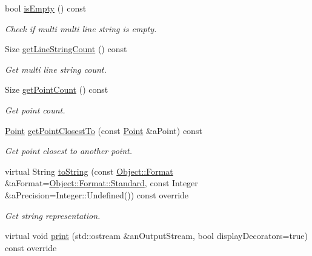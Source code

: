 \begin{DoxyCompactItemize}
bool \hyperlink{classostk_1_1math_1_1geom_1_1d2_1_1objects_1_1_multi_line_string_a5d9130266958b3cddbcfd9ac085074f9}{is\+Empty} () const
\begin{DoxyCompactList}\small\item\em Check if multi multi line string is empty. \end{DoxyCompactList}\item 
Size \hyperlink{classostk_1_1math_1_1geom_1_1d2_1_1objects_1_1_multi_line_string_ad4bf5470a4824babbe4fb314b58537a0}{get\+Line\+String\+Count} () const
\begin{DoxyCompactList}\small\item\em Get multi line string count. \end{DoxyCompactList}\item 
Size \hyperlink{classostk_1_1math_1_1geom_1_1d2_1_1objects_1_1_multi_line_string_a79be04f2c6bddfa1689b6eefba45fc83}{get\+Point\+Count} () const
\begin{DoxyCompactList}\small\item\em Get point count. \end{DoxyCompactList}\item 
\hyperlink{classostk_1_1math_1_1geom_1_1d2_1_1objects_1_1_point}{Point} \hyperlink{classostk_1_1math_1_1geom_1_1d2_1_1objects_1_1_multi_line_string_ad8b2805d38191a13711bd7255ea48e9f}{get\+Point\+Closest\+To} (const \hyperlink{classostk_1_1math_1_1geom_1_1d2_1_1objects_1_1_point}{Point} \&a\+Point) const
\begin{DoxyCompactList}\small\item\em Get point closest to another point. \end{DoxyCompactList}\item 
virtual String \hyperlink{classostk_1_1math_1_1geom_1_1d2_1_1objects_1_1_multi_line_string_a87df673d41e16eb2b196c8b8a852d71f}{to\+String} (const \hyperlink{classostk_1_1math_1_1geom_1_1d2_1_1_object_aa76f9e30caebf4005bafbdff447f66cf}{Object\+::\+Format} \&a\+Format=\hyperlink{classostk_1_1math_1_1geom_1_1d2_1_1_object_aa76f9e30caebf4005bafbdff447f66cfaeb6d8ae6f20283755b339c0dc273988b}{Object\+::\+Format\+::\+Standard}, const Integer \&a\+Precision=Integer\+::\+Undefined()) const override
\begin{DoxyCompactList}\small\item\em Get string representation. \end{DoxyCompactList}\item 
virtual void \hyperlink{classostk_1_1math_1_1geom_1_1d2_1_1objects_1_1_multi_line_string_a5e90edd640ee9262194eb07d943bb8bb}{print} (std\+::ostream \&an\+Output\+Stream, bool display\+Decorators=true) const override

\end{DoxyCompactItemize}
